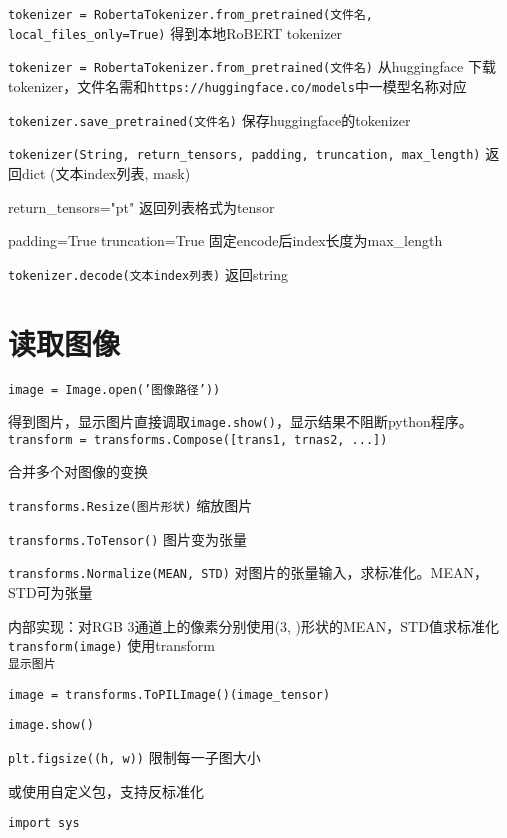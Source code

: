 \documentclass[UTF8]{ctexart}
\begin{document}
  \texttt{tokenizer = RobertaTokenizer.from\_pretrained(文件名, local\_files\_only=True)} 得到本地RoBERT tokenizer

  \texttt{tokenizer = RobertaTokenizer.from\_pretrained(文件名)} 从huggingface 下载tokenizer，文件名需和\texttt{https://huggingface.co/models}中一模型名称对应

  \texttt{tokenizer.save\_pretrained(文件名)} 保存huggingface的tokenizer

  \texttt{tokenizer(String, return\_tensors, padding, truncation, max\_length)} 返回dict (文本index列表, mask)

  \quad return\_tensors="pt" 返回列表格式为tensor

  \quad padding=True truncation=True 固定encode后index长度为max\_length

  \texttt{tokenizer.decode(文本index列表)} 返回string

\section{读取图像}
\noindent \texttt{image = Image.open('图像路径'))}

  得到图片，显示图片直接调取\texttt{image.show()}，显示结果不阻断python程序。\\
\texttt{transform = transforms.Compose([trans1, trnas2, ...])}

  合并多个对图像的变换

  \texttt{transforms.Resize(图片形状)} 缩放图片

  \texttt{transforms.ToTensor()} 图片变为张量

  \texttt{transforms.Normalize(MEAN, STD)} 对图片的张量输入，求标准化。MEAN，STD可为张量
  
  \quad 内部实现：对RGB 3通道上的像素分别使用(3, )形状的MEAN，STD值求标准化\\
\texttt{transform(image)} 使用transform\\
\texttt{显示图片}

  \texttt{image = transforms.ToPILImage()(image\_tensor)}

  \texttt{image.show()}
  
  \texttt{plt.figsize((h, w))} 限制每一子图大小

  或使用自定义包，支持反标准化

  \texttt{import sys}
\end{document}
